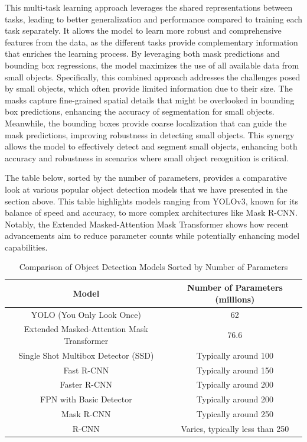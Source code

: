 This multi-task learning approach leverages the shared representations between tasks, leading to better generalization and performance compared to training each 
task separately. It allows the model to learn more robust and comprehensive features from the data, as the different tasks provide complementary information that 
enriches the learning process. By leveraging both mask predictions and bounding box regressions, the model maximizes the use of all available data from small objects. 
Specifically, this combined approach addresses the challenges posed by small objects, which often provide limited information due to their size. The masks capture 
fine-grained spatial details that might be overlooked in bounding box predictions, enhancing the accuracy of segmentation for small objects. Meanwhile, the bounding 
boxes provide coarse localization that can guide the mask predictions, improving robustness in detecting small objects. This synergy allows the model to effectively 
detect and segment small objects, enhancing both accuracy and robustness in scenarios where small object recognition is critical.

The table below, sorted by the number of parameters, provides a comparative look at various popular object detection models that we have presented in the 
section above. This table highlights models ranging from YOLOv3, known for its balance of speed and accuracy, to more complex architectures like Mask R-CNN. 
Notably, the Extended Masked-Attention Mask Transformer shows how recent advancements aim to reduce parameter counts while potentially enhancing model 
capabilities.

\begin{table}[h!]
    \centering
    \begin{tabular}{|c|c|}
    \hline
    \textbf{Model}                                 & \textbf{Number of Parameters (millions)} \\ \hline
    YOLO (You Only Look Once)                      & 62                                      \\ \hline
    Extended Masked-Attention Mask Transformer     & 76.6                                    \\ \hline
    Single Shot    Multibox Detector (SSD)         & Typically around 100                    \\ \hline
    Fast R-CNN                                     & Typically around 150                    \\ \hline
    Faster R-CNN                                   & Typically around 200                    \\ \hline
    FPN with Basic Detector                        & Typically around 200                    \\ \hline
    Mask R-CNN                                     & Typically around 250                    \\ \hline
    R-CNN                                          & Varies, typically less than 250         \\ \hline
    \end{tabular}
    \caption{Comparison of Object Detection Models Sorted by Number of Parameters}
    \label{tab:model_parameters}
\end{table}
    
